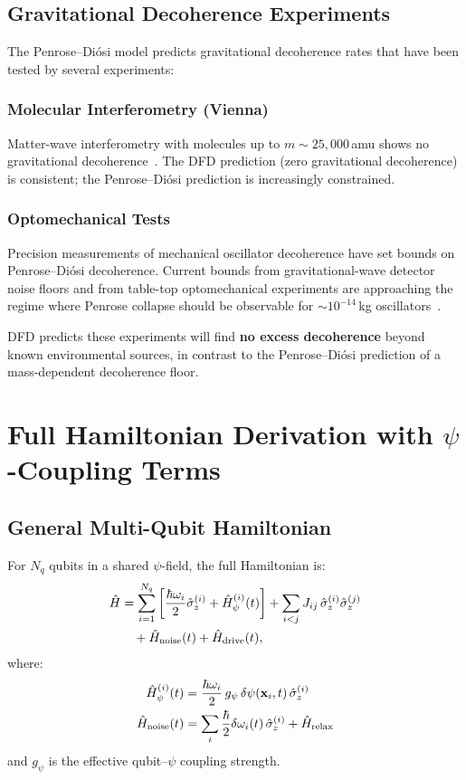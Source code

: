 \documentclass[aps,prd,twocolumn,superscriptaddress,nofootinbib]{revtex4-2}
\begin{document}
\subsection{Gravitational Decoherence Experiments}

The Penrose--Di\'osi model predicts gravitational decoherence rates
that have been tested by several experiments:

\subsubsection{Molecular Interferometry (Vienna)}
Matter-wave interferometry with molecules up to $m \sim 25{,}000$\,amu
shows no gravitational decoherence~\cite{Fein2019}. The DFD prediction
(zero gravitational decoherence) is consistent; the Penrose--Di\'osi
prediction is increasingly constrained.

\subsubsection{Optomechanical Tests}
Precision measurements of mechanical oscillator decoherence have set
bounds on Penrose--Di\'osi decoherence. Current bounds from
gravitational-wave detector noise floors and from table-top
optomechanical experiments are approaching the regime where Penrose
collapse should be observable for $\sim 10^{-14}$\,kg
oscillators~\cite{Donadi2021}.

DFD predicts these experiments will find \textbf{no excess decoherence}
beyond known environmental sources, in contrast to the Penrose--Di\'osi
prediction of a mass-dependent decoherence floor.

\section{Full Hamiltonian Derivation with $\psi$-Coupling Terms}
\label{sec:hamiltonian}

\subsection{General Multi-Qubit Hamiltonian}

For $N_q$ qubits in a shared $\psi$-field, the full Hamiltonian is:
\begin{align}
\hat{H} &= \sum_{i=1}^{N_q}\left[\frac{\hbar\omega_i}{2}\hat{\sigma}_z^{(i)}
+ \hat{H}_{\psi}^{(i)}(t)\right]
+ \sum_{i<j} J_{ij}\,\hat{\sigma}_z^{(i)}\hat{\sigma}_z^{(j)}
\nonumber\\
&\quad + \hat{H}_{\rm noise}(t) + \hat{H}_{\rm drive}(t),
\label{eq:full-H}
\end{align}
where:
\begin{align}
\hat{H}_\psi^{(i)}(t) &= \frac{\hbar\omega_i}{2}\,g_\psi\,\delta\psi
(\mathbf{x}_i, t)\,\hat{\sigma}_z^{(i)} \label{eq:H-psi-qubit}\\
\hat{H}_{\rm noise}(t) &= \sum_i \frac{\hbar}{2}\delta\omega_i(t)\,
\hat{\sigma}_z^{(i)} + \hat{H}_{\rm relax}
\end{align}
and $g_\psi$ is the effective qubit--$\psi$ coupling strength.
\end{document}
